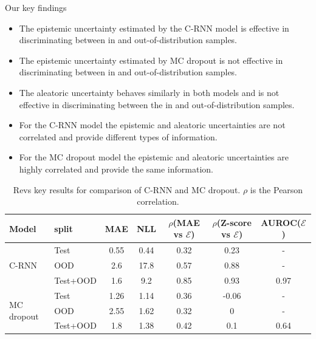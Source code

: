 Our key findings 

\begin{itemize}
    \item The epistemic uncertainty estimated by the C-RNN model is effective in discriminating between in and out-of-distribution samples.
    
    \item The epistemic uncertainty estimated by MC dropout is not effective in discriminating between in and out-of-distribution samples.
    
    \item The aleatoric uncertainty behaves similarly in both models and is not effective in discriminating between the in and out-of-distribution samples.
    
    \item For the C-RNN model the epistemic and aleatoric uncertainties are not correlated and provide different types of information.
    
    \item For the MC dropout model the epistemic and aleatoric uncertainties are highly correlated and provide the same information. 
\end{itemize}{}


\begin{table}[htbp]
\centering
    \begin{tabular}{l l c c c c c}  
        \toprule
        Model & split & MAE & NLL & $\rho$(MAE vs $\mathcal{E}$) &
        $\rho$(Z-score vs $\mathcal{E}$) & AUROC($\mathcal{E}$)\\
        \midrule
        \multirow{3}{*}{C-RNN} 
            & Test     & 0.55& 0.44 & 0.32  & 0.23 & - \\  
            & OOD      & 2.6 & 17.8 & 0.57  & 0.88 & -\\  
            & Test+OOD & 1.6 & 9.2  & 0.85  & 0.93 & 0.97\\ 

        \midrule
        \multirow{3}{*}{MC dropout} 
            & Test     & 1.26 & 1.14  & 0.36  & -0.06 & - \\  
            & OOD      & 2.55 & 1.62  & 0.32  & 0 & -\\  
            & Test+OOD & 1.8  & 1.38  & 0.42  & 0.1 & 0.64\\ 

        \toprule
    \end{tabular}
    \caption[Revs key results for comparison of C-RNN and MC dropout]{Revs key results for comparison of C-RNN and MC dropout. $\rho$ is the Pearson correlation.}
    \label{tbl:revs_comparison}
\end{table}


